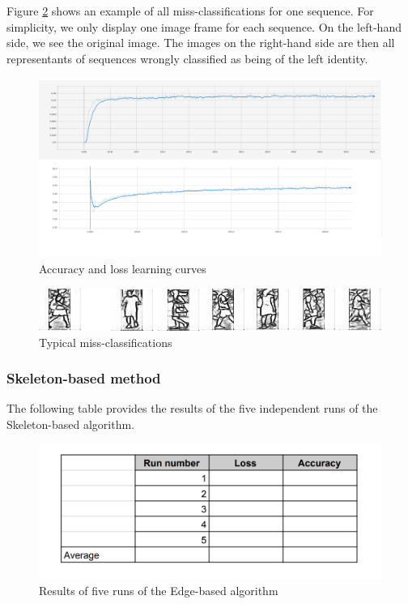 Figure \ref{fig:missclassifications} shows an example of all  miss-classifications for one sequence. For simplicity, we only display one image frame for each sequence. On the left-hand side, we see the original image. The images on the right-hand side are then all representants of sequences wrongly classified as being of the left identity.

\begin{figure}[h!]
    \centering
    \includegraphics[scale=0.18]{figures/learning_curve.png}
    \caption{Accuracy and loss learning curves}
    \label{fig:edge_based_learning_curve_accuracy}
\end{figure}

\begin{figure}[h!]
    \centering
    \includegraphics[scale=0.7]{figures/missclassifications.png}
    \caption{Typical miss-classifications}
    \label{fig:missclassifications}
\end{figure}

\subsubsection{Skeleton-based method}

The following table provides the results of the five independent runs of the Skeleton-based algorithm.

\begin{figure}[h!]
    \centering
    \includegraphics[scale=0.22]{figures/results.png}
    \caption{Results of five runs of the Edge-based algorithm}
    \label{fig:skeleton_based_met_results}
\end{figure}

